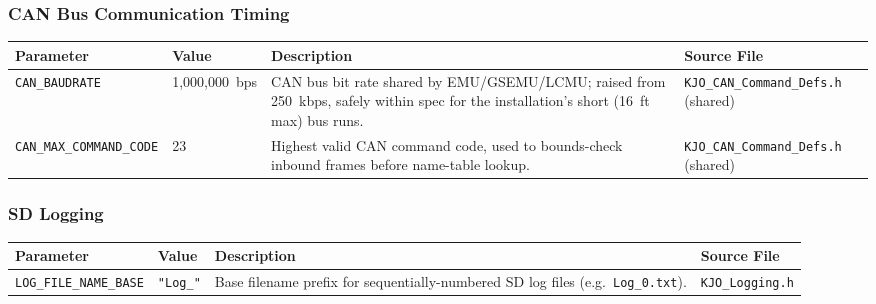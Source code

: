﻿\documentclass[11pt,letterpaper]{article}
\begin{document}
\subsubsection*{CAN Bus Communication Timing}

\begingroup
\footnotesize
\begin{longtable}{@{}p{3.2cm}p{2.4cm}p{6.2cm}p{2.6cm}@{}}
\toprule
Parameter & Value & Description & Source File \\
\midrule
\texttt{CAN\_\allowbreak BAUDRATE} & 1{,}000{,}000~bps & CAN bus bit rate shared by EMU/GSEMU/LCMU; raised from 250~kbps, safely within spec for the installation's short (16~ft max) bus runs. & \texttt{KJO\_\allowbreak CAN\_\allowbreak Command\_\allowbreak Defs.h} (shared) \\
\texttt{CAN\_\allowbreak MAX\_\allowbreak COMMAND\_\allowbreak CODE} & 23 & Highest valid CAN command code, used to bounds-check inbound frames before name-table lookup. & \texttt{KJO\_\allowbreak CAN\_\allowbreak Command\_\allowbreak Defs.h} (shared) \\
\end{longtable}
\endgroup

\subsubsection*{SD Logging}

\begingroup
\footnotesize
\begin{longtable}{@{}p{3.2cm}p{2.4cm}p{6.2cm}p{2.6cm}@{}}
\toprule
Parameter & Value & Description & Source File \\
\midrule
\texttt{LOG\_\allowbreak FILE\_\allowbreak NAME\_\allowbreak BASE} & \texttt{"Log\_\allowbreak "} & Base filename prefix for sequentially-numbered SD log files (e.g.\ \texttt{Log\_\allowbreak 0.txt}). & \texttt{KJO\_\allowbreak Logging.h} \\
\end{longtable}
\endgroup

\end{document}
